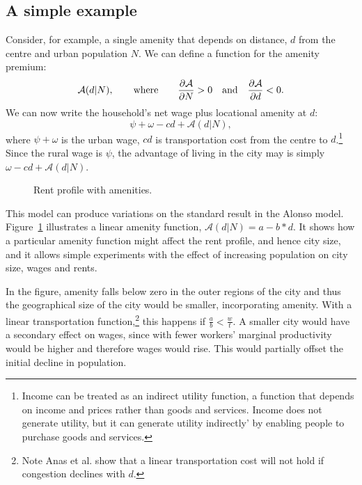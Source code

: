  \subsection{A simple example}
Consider, for example, a single amenity that depends on distance, $d$ from the centre and urban population $N$.
We can define a function for the \gls{amenity premium}: \[\mathcal{A}(d| N), \qquad \text{where} \qquad \frac{\partial \mathcal{A}}{\partial N}> 0 \quad \text{and} \quad\frac{\partial \mathcal{A}}{\partial d}< 0.\] 
We can now write the household's net wage plus locational amenity at $d$:
\begin{equation} \psi+ \omega-cd + \mathcal{A}(d| N), 
\label{eqn-u}
\end{equation}
where $\psi+ \omega$  is the urban wage, $cd$ is transportation cost from the centre to $d$.\footnote{Income can be treated as an indirect utility function, a function that depends on income and prices rather than goods and services.  Income does not generate utility, but it can generate utility indirectly' by enabling people to purchase goods and services.}  Since the rural wage is $\psi$, the advantage of living in the city may is simply $\omega-cd + \mathcal{A}(d|N)$.



\begin{figure}[t!b]
\begin{center}

\end{center}
\caption[Rent profile with amenities]{Rent profile with amenities.}
\label{fig-amenity}
\end{figure}

 
This model can produce variations on the standard result in the Alonso model. Figure~\ref{fig-amenity} illustrates a linear amenity function, $\mathcal{A}(d|N)= a-b*d$.  It shows how a particular amenity function might affect the rent profile, and hence city size, and it allows simple experiments with the effect of increasing population on city size, wages and rents.

In the figure, amenity falls below zero in the outer regions of the city and thus the geographical size of the city would be smaller, incorporating amenity. With a linear transportation function,\footnote{Note Anas et al. \cite{anasUrbanSpatialStructure1998} show that a linear transportation cost will not hold if congestion declines with $d$.} this happens if $\frac{a}{b} < \frac{w}{t}$. A smaller city would have a secondary effect on wages, since with fewer workers' marginal productivity would be higher and therefore wages would rise. This would partially offset the initial decline in population.

